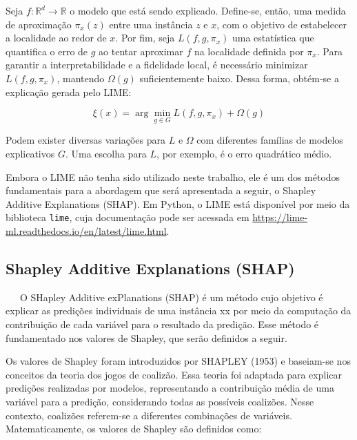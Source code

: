 \documentclass[
  12pt,
  a4paper,
]{scrreprt}
\begin{document}
\vspace{12pt}

Seja \(f: \mathbb{R}^d \rightarrow \mathbb{R}\) o modelo que está sendo
explicado. Define-se, então, uma medida de aproximação
\(\pi_x\left(z\right)\) entre uma instância \(z\) e \(x\), com o
objetivo de estabelecer a localidade ao redor de \(x\). Por fim, seja
\(L\left(f, g, \pi_x\right)\) uma estatística que quantifica o erro de
\(g\) ao tentar aproximar \(f\) na localidade definida por \(\pi_x\).
Para garantir a interpretabilidade e a fidelidade local, é necessário
minimizar \(L(f, g, \pi_x)\), mantendo \(\Omega(g)\) suficientemente
baixo. Dessa forma, obtém-se a explicação gerada pelo LIME:

\[
\xi\left(x\right) = \arg \min_{g \in G} L\left(f, g, \pi_x\right) + \Omega\left(g\right)
\]

Podem exister diversas variações para \(L\) e \(\Omega\) com diferentes
famílias de modelos explicativos \(G\). Uma escolha para \(L\), por
exemplo, é o erro quadrático médio.

\vspace{12pt}

Embora o LIME não tenha sido utilizado neste trabalho, ele é um dos
métodos fundamentais para a abordagem que será apresentada a seguir, o
Shapley Additive Explanations (SHAP). Em Python, o LIME está disponível
por meio da biblioteca \texttt{lime}, cuja documentação pode ser
acessada em \url{https://lime-ml.readthedocs.io/en/latest/lime.html}.

\subsection{Shapley Additive Explanations
(SHAP)}\label{shapley-additive-explanations-shap}

~~~O SHapley Additive exPlanations (SHAP) é um método cujo objetivo é
explicar as predições individuais de uma instância xx por meio da
computação da contribuição de cada variável para o resultado da
predição. Esse método é fundamentado nos valores de Shapley, que serão
definidos a seguir.

\vspace{12pt}

Os valores de Shapley foram introduzidos por SHAPLEY (1953) e baseiam-se
nos conceitos da teoria dos jogos de coalizão. Essa teoria foi adaptada
para explicar predições realizadas por modelos, representando a
contribuição média de uma variável para a predição, considerando todas
as possíveis coalizões. Nesse contexto, coalizões referem-se a
diferentes combinações de variáveis. Matematicamente, os valores de
Shapley são definidos como:
\end{document}
